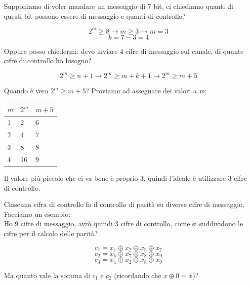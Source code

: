 Supponiamo di voler mandare un messaggio di 7 bit, ci chiediamo quanti di questi bit possono essere di messaggio e quanti di controllo?

\begin{equation*}
2^m \geq 8 \rightarrow m \geq 3 \rightarrow m=3
\end{equation*}
\begin{equation*}
k = 7 - 3 = 4
\end{equation*}

\newpage

Oppure posso chiedermi: devo inviare 4 cifre di messaggio sul canale, di quante cifre di controllo ho bisogno?

\begin{equation*}
2^m \geq n+1 \rightarrow 2^m \geq m+k+1 \rightarrow 2^m \geq m+5
\end{equation*}

Quando è vero $2^m \geq m+5$? Proviamo ad assegnare dei valori a \textit{m}:

\begin{table}[h]
	\centering
	\begin{tabular}{l|l|l}
		$m$ & $2^m$ & $m+5$ \\
		\hline
		1   & 2     & 6     \\
		2   & 4     & 7     \\
		3   & 8     & 8     \\
		4   & 16    & 9    
	\end{tabular}
\end{table}

Il valore più piccolo che ci va bene è proprio 3, quindi l'ideale è utilizzare 3 cifre di controllo.

Ciascuna cifra di controllo fa il controllo di parità su diverse cifre di messaggio. Facciamo un esempio:\\
Ho 9 cifre di messaggio, avrò quindi 3 cifre di controllo, come si suddividono le cifre per il calcolo delle parità?


\begin{equation}
c_1 = x_1 \oplus x_2 \oplus x_5 \oplus x_7
\end{equation}
\begin{equation*}
c_2 = x_5 \oplus x_7 \oplus x_8 \oplus x_9
\end{equation*}
\begin{equation*}
c_3 = x_1 \oplus x_2 \oplus x_8 \oplus x_9
\end{equation*}

Ma quanto vale la somma di $c_1$ e $c_2$ (ricordando che $x \oplus 0 = x$)?

